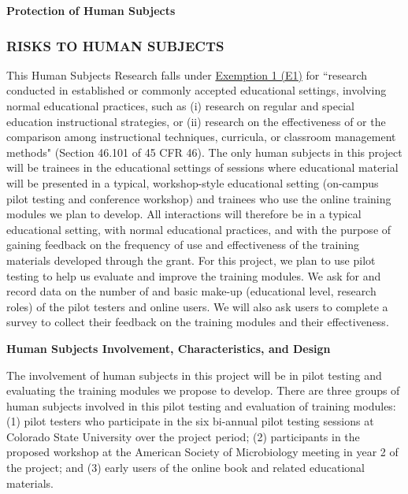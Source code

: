 \documentclass[pdftex,english,11.5pt,parskip=half]{scrartcl}
\begin{document}
\def\bf{\normalfont\bfseries}
\pagestyle{empty}

{\large \textbf{Protection of Human Subjects}}

\subsubsection*{RISKS TO HUMAN SUBJECTS}

This Human Subjects Research falls under \underline{Exemption 1 (E1)} for ``research conducted in established or commonly accepted educational settings, involving normal educational practices, such as (i) research on regular and special education instructional strategies, or (ii) research on the effectiveness of or the comparison among instructional techniques, curricula, or classroom management methods" (Section 46.101 of 45 CFR 46). The only human subjects in this project will be trainees in the educational settings of sessions where educational material will be presented in a typical, workshop-style educational setting (on-campus pilot testing and conference workshop) and trainees who use the online training modules we plan to develop. All interactions will therefore be in a typical educational setting, with normal educational practices, and with the purpose of gaining feedback on the frequency of use and effectiveness of the training materials developed through the grant. For this project, we plan to use pilot testing to help us evaluate and improve the training modules. We ask for and record data on the number of and basic make-up (educational level, research roles) of the pilot testers and online users. We will also ask users to complete a survey to collect their feedback on the training modules and their effectiveness. 

\textbf{Human Subjects Involvement, Characteristics, and Design}

The involvement of human subjects in this project will be in pilot testing and 
evaluating the training modules we propose to develop. There are three groups of
human subjects involved in this pilot testing and evaluation of training modules: 
(1) pilot testers who participate in the six bi-annual pilot testing sessions at 
Colorado State University over the project period; (2) participants in the proposed
workshop at the American Society of Microbiology meeting in year 2 of the project; 
and (3) early users of the online book and related educational materials. 
\end{document}
